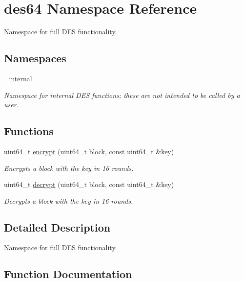 \hypertarget{namespacedes64}{}\section{des64 Namespace Reference}
\label{namespacedes64}


Namespace for full D\+ES functionality.  


\subsection*{Namespaces}
\begin{DoxyCompactItemize}
\item 
 \hyperlink{namespacedes64_1_1__internal}{\+\_\+internal}
\begin{DoxyCompactList}\small\item\em Namespace for internal D\+ES functions; these are not intended to be called by a user. \end{DoxyCompactList}\end{DoxyCompactItemize}
\subsection*{Functions}
\begin{DoxyCompactItemize}
\item 
uint64\+\_\+t \hyperlink{namespacedes64_a0a2c11a71d92fc154f7611b6425991fc}{encrypt} (uint64\+\_\+t block, const uint64\+\_\+t \&key)
\begin{DoxyCompactList}\small\item\em Encrypts a block with the key in 16 rounds. \end{DoxyCompactList}\item 
uint64\+\_\+t \hyperlink{namespacedes64_abb5c89372163778e5b9dd66ae38a68bf}{decrypt} (uint64\+\_\+t block, const uint64\+\_\+t \&key)
\begin{DoxyCompactList}\small\item\em Decrypts a block with the key in 16 rounds. \end{DoxyCompactList}\end{DoxyCompactItemize}


\subsection{Detailed Description}
Namespace for full D\+ES functionality. 

\subsection{Function Documentation}
